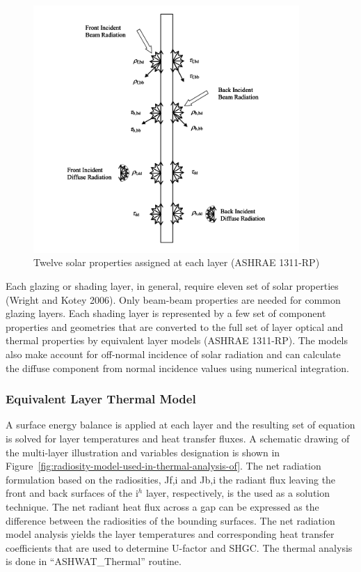 \begin{figure}[hbtp] %
\centering
\includegraphics[width=0.9\textwidth, height=0.9\textheight, keepaspectratio=true]{media/image1830.svg.png}
\caption{Twelve solar properties assigned at each layer (ASHRAE 1311-RP) \protect \label{fig:twelve-solar-properties-assigned-at-each}}
\end{figure}

Each glazing or shading layer, in general, require eleven set of solar properties (Wright and Kotey 2006). Only beam-beam properties are needed for common glazing layers. Each shading layer is represented by a few set of component properties and geometries that are converted to the full set of layer optical and thermal properties by equivalent layer models (ASHRAE 1311-RP). The models also make account for off-normal incidence of solar radiation and can calculate the diffuse component from normal incidence values using numerical integration.

\subsubsection{Equivalent Layer Thermal Model}\label{equivalent-layer-thermal-model}

A surface energy balance is applied at each layer and the resulting set of equation is solved for layer temperatures and heat transfer fluxes. A schematic drawing of the multi-layer illustration and variables designation is shown in Figure~\ref{fig:radiosity-model-used-in-thermal-analysis-of}. The net radiation formulation based on the radiosities, Jf,i and Jb,i the radiant flux leaving the front and back surfaces of the i\(^{h}\) layer, respectively, is the used as a solution technique. The net radiant heat flux across a gap can be expressed as the difference between the radiosities of the bounding surfaces. The net radiation model analysis yields the layer temperatures and corresponding heat transfer coefficients that are used to determine U-factor and SHGC. The thermal analysis is done in ``ASHWAT\_Thermal'' routine.

